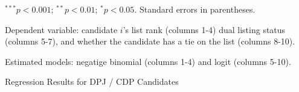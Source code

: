 \begin{table}[!htbp]
\begin{center}
{\begin{threeparttable}
\begin{tablenotes}[flushleft]
\scriptsize{\item $^{***}p<0.001$; $^{**}p<0.01$; $^{*}p<0.05$. Standard errors in parentheses.
\item Dependent variable: candidate $i$'s list rank (columns 1-4) dual listing status (columns 5-7), and whether the candidate has a tie on the list (columns 8-10).
\item Estimated models: negatige binomial (columns 1-4) and logit (columns 5-10).}
\end{tablenotes}
\end{threeparttable}
}
\caption{Regression Results for DPJ / CDP Candidates}
\label{tab:dpj_cdp}
\end{center}
\end{table}
